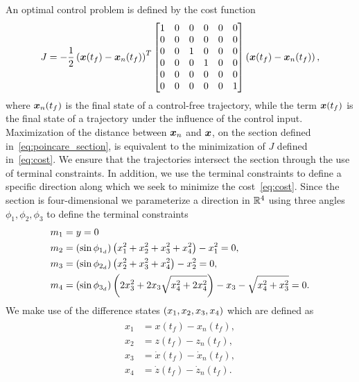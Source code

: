 \documentclass[]{aiaa-tc}%
\begin{document}
An optimal control problem is defined by the cost function
\begin{align}\label{eq:cost}
    J = -\frac{1}{2} \left( \bm{x}(t_f) - \bm{x}_{n}(t_f)\right)^T 
    \begin{bmatrix}
        1 & 0 & 0 & 0 & 0 & 0 \\
        0 & 0 & 0 & 0 & 0 & 0 \\
        0 & 0 & 1 & 0 & 0 & 0 \\
        0 & 0 & 0 & 1 & 0 & 0 \\
        0 & 0 & 0 & 0 & 0 & 0 \\
        0 & 0 & 0 & 0 & 0 & 1 \\
    \end{bmatrix}
    \left( \bm{x}(t_f) - \bm{x}_{n}(t_f)\right) ,
\end{align}
where \( \bm{x}_n(t_f) \) is the final state of a control-free trajectory, while the term \( \bm{x}(t_f)\) is the final state of a trajectory under the influence of the control input.
Maximization of the distance between \( \bm{x}_n \) and \(\bm{x} \), on the \Poincare section defined in~\cref{eq:poincare_section}, is equivalent to the minimization of \( J \) defined in~\cref{eq:cost}.
We ensure that the trajectories intersect the \Poincare section through the use of terminal constraints.
In addition, we use the terminal constraints to define a specific direction along which we seek to minimize the cost~\cref{eq:cost}.
Since the \Poincare section is four-dimensional we parameterize a direction in \( \mathbb{R}^4 \)  using three angles \( \phi_1, \phi_2 , \phi_3 \) to define the terminal constraints
\begin{align}\label{eq:terminal_constraints}
    \begin{split}
        m_1 &= y = 0 \\
        m_2 &= \left( \sin \phi_{1_{d}} \right) \left(  x_1^2 + x_2^2 + x_3^2 + x_4^2 \right) - x_1^2 = 0, \\
        m_3 &= \left( \sin \phi_{2_{d}} \right) \left(  x_2^2 + x_3^2 + x_4^2 \right) - x_2^2 = 0, \\
        m_4 &= \left( \sin \phi_{3_{d}} \right) \left(  2 x_3^2 + 2 x_3 \sqrt{x_4^2 + 2 x_4^2} \right) - x_3 - \sqrt{x_4^2 + x_3^2} = 0. 
    \end{split}
\end{align}
We make use of the difference states \( \left( x_1, x_2 ,x_3, x_4  \right)\) which are defined as
\begin{align}\label{eq:diff_states}
    \begin{split}
        x_1 &= x(t_f) - x_n(t_f) , \\
        x_2 &= z(t_f) - z_n(t_f) , \\
        x_3 &= \dot{x}(t_f) - \dot{x}_n(t_f) , \\
        x_4 &= \dot{z}(t_f) - \dot{z}_n(t_f) . \\
    \end{split}
\end{align}
\end{document}
